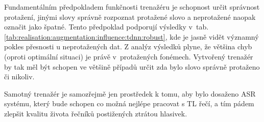 Fundamentálním předpokladem funkčnosti trenažéru je schopnost určit správnost protažení, jinými slovy správně rozpoznat protažené slovo a neprotažené naopak označit jako špatné. Tento předpoklad podporují výsledky v~tab. \ref{tab:realisation:augmentation:influence:tdnn:robust}, kde je jasně vidět významný pokles přesnosti u neprotažených dat. Z analýz výsledků plyne, že většina chyb (oproti optimální situaci) je právě v~protažených fonémech. Vytvořený trenažér by tak měl být schopen ve většině případů určit zda bylo slovo správně protaženo či nikoliv.

Samotný trenažér je samozřejmě jen prostředek k tomu, aby bylo dosaženo ASR systému, který bude schopen co možná nejlépe pracovat s TL řečí, a tím pádem zlepšit kvalitu života řečníků postižených ztrátou hlasivek.



